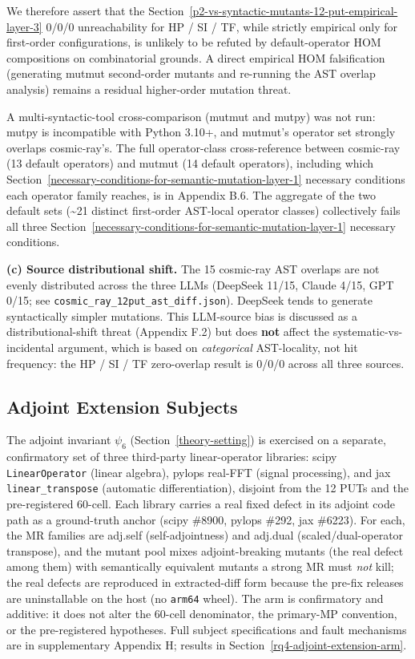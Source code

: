 \documentclass[manuscript,screen,review]{acmart}
\begin{document}
We therefore assert that the Section~\ref{p2-vs-syntactic-mutants-12-put-empirical-layer-3} 0/0/0 unreachability for HP / SI / TF,
while strictly empirical only for first-order configurations, is
unlikely to be refuted by default-operator HOM compositions on
combinatorial grounds. A direct empirical HOM falsification (generating
mutmut second-order mutants and re-running the AST overlap analysis)
remains a residual higher-order mutation threat.

A multi-syntactic-tool cross-comparison (mutmut and mutpy) was not run:
mutpy is incompatible with Python 3.10+, and mutmut's operator
set strongly overlaps cosmic-ray's. The full operator-class
cross-reference between cosmic-ray (13 default operators) and mutmut (14
default operators), including which Section~\ref{necessary-conditions-for-semantic-mutation-layer-1} necessary conditions each
operator family reaches, is in Appendix B.6. The aggregate of the two
default sets (\textasciitilde21 distinct first-order AST-local operator
classes) collectively fails all three Section~\ref{necessary-conditions-for-semantic-mutation-layer-1} necessary conditions.

\textbf{(c) Source distributional shift.} The 15 cosmic-ray AST
overlaps are not evenly distributed across the three LLMs (DeepSeek
11/15, Claude 4/15, GPT 0/15; see
\texttt{cosmic\_ray\_12put\_ast\_diff.json}). DeepSeek tends to generate
syntactically simpler mutations. This LLM-source bias is discussed as a
distributional-shift threat
(Appendix F.2) but does \textbf{not} affect the systematic-vs-incidental
argument, which is based on \emph{categorical} AST-locality, not hit
frequency: the HP / SI / TF zero-overlap result is 0/0/0 across all
three sources.

\subsection{Adjoint Extension Subjects}\label{adjoint-extension-arm-subjects}

The adjoint invariant $\psi_6$ (Section~\ref{theory-setting}) is exercised on a separate,
confirmatory set of three third-party linear-operator libraries:
scipy \texttt{LinearOperator} (linear algebra), pylops real-FFT (signal
processing), and jax \texttt{linear\_transpose} (automatic
differentiation), disjoint from the 12 PUTs and the pre-registered
60-cell. Each library carries a real fixed defect in its adjoint code
path as a ground-truth anchor (scipy \#8900, pylops \#292, jax \#6223).
For each, the MR families are adj.self (self-adjointness) and adj.dual
(scaled/dual-operator transpose), and the mutant pool mixes
adjoint-breaking mutants (the real defect among them) with semantically
equivalent mutants a strong MR must \emph{not} kill; the real defects are
reproduced in extracted-diff form because the pre-fix releases are
uninstallable on the host (no \texttt{arm64} wheel). The arm is
confirmatory and additive: it does not alter the 60-cell denominator, the
primary-MP convention, or the pre-registered hypotheses. Full subject
specifications and fault mechanisms are in supplementary Appendix H;
results in Section~\ref{rq4-adjoint-extension-arm}.
\end{document}
